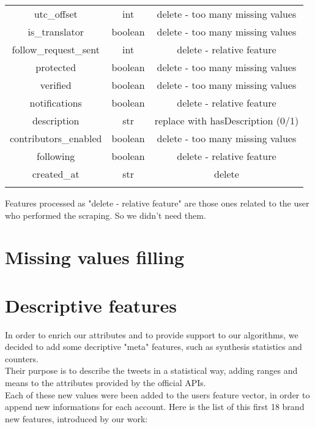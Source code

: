 \begin{center}
\begin{tabular}{ccc}
		utc\_offset&int&delete - too many missing values\\
		is\_translator&boolean&delete - too many missing values\\
		follow\_request\_sent&int&delete - relative feature\\
		protected&boolean&delete - too many missing values\\
		verified&boolean&delete - too many missing values\\
		notifications&boolean&delete - relative feature\\
		description&str&replace with hasDescription (0/1)\\
		contributors\_enabled&boolean&delete - too many missing values\\
		following&boolean&delete - relative feature\\
		created\_at&str&delete\\\hline\\
	\end{tabular}
\end{center}
\normalsize
Features processed as "delete - relative feature" are those ones related to the user who performed the scraping. So we didn't need them.

\section{Missing values filling}
\section{Descriptive features}

In order to enrich our attributes and to provide support to our algorithms, we decided to add some decriptive "meta" features, such as synthesis statistics and counters.\\
Their purpose is to describe the tweets in a statistical way, adding ranges and means to the attributes provided by the official APIs.\\
Each of these new values were been added to the users feature vector, in order to append new informations for each account.
Here is the list of this first 18 brand new features, introduced by our work:

